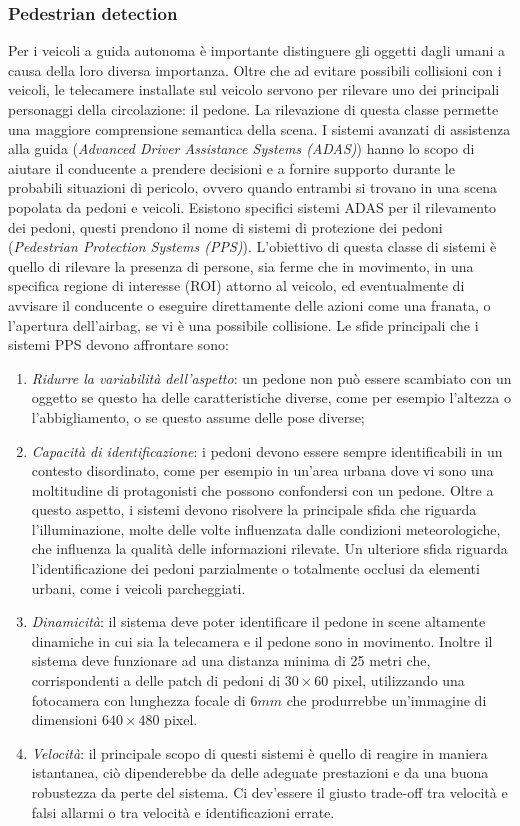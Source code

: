 \subsubsection{Pedestrian detection}
Per i veicoli a guida autonoma è importante distinguere gli oggetti dagli 
umani a causa della loro diversa importanza. Oltre che ad evitare possibili 
collisioni con i veicoli, le telecamere installate sul veicolo servono per 
rilevare uno dei principali personaggi della circolazione: il pedone. La rilevazione di 
questa classe permette una maggiore comprensione semantica della scena. I 
sistemi avanzati di assistenza alla guida (\emph{Advanced Driver Assistance Systems 
(ADAS)}) hanno lo scopo di aiutare il conducente a prendere decisioni 
e a fornire supporto durante le probabili situazioni di pericolo,  ovvero quando 
entrambi si trovano in una scena popolata da pedoni e veicoli. Esistono 
specifici sistemi ADAS per il rilevamento dei pedoni, questi prendono il 
nome di sistemi di protezione dei pedoni (\emph{Pedestrian Protection Systems 
(PPS)}). L'obiettivo di questa classe di sistemi è quello di rilevare la presenza 
di persone, sia ferme che in movimento, in una specifica regione di interesse 
(ROI) attorno al veicolo, ed eventualmente di avvisare il conducente  o eseguire 
direttamente delle azioni come una franata, o l'apertura dell'airbag, 
se vi è una possibile collisione. Le sfide principali che i sistemi PPS devono 
affrontare sono:
\begin{enumerate}
    \item \emph{Ridurre la variabilità dell'aspetto}: un pedone non può essere scambiato 
    con un oggetto se questo ha delle caratteristiche diverse, come per 
    esempio l'altezza o l'abbigliamento, o se questo assume delle pose 
    diverse;
    \item \emph{Capacità di identificazione}: i pedoni devono essere sempre identificabili 
    in un contesto disordinato, come per esempio in un'area urbana 
    dove vi sono una moltitudine di protagonisti che possono confondersi 
    con un pedone. Oltre a questo aspetto, i sistemi devono risolvere la 
    principale sfida che riguarda l'illuminazione, molte delle volte influenzata 
    dalle condizioni meteorologiche, che influenza la qualità delle 
    informazioni rilevate. Un ulteriore sfida riguarda l'identificazione dei 
    pedoni parzialmente o totalmente occlusi da elementi urbani, come i 
    veicoli parcheggiati. 
    \item \emph{Dinamicità}: il sistema deve poter identificare il pedone in scene 
    altamente dinamiche in cui sia la telecamera e il pedone sono in 
    movimento. Inoltre il sistema deve funzionare ad una distanza minima 
    di 25 metri che, corrispondenti a delle patch di pedoni di $30\times 60$ 
    pixel, utilizzando una fotocamera con lunghezza focale di $6 mm$ che 
    produrrebbe un'immagine di dimensioni $640\times 480$ pixel.
    \item \emph{Velocità}: il principale scopo di questi sistemi è quello di reagire in 
    maniera istantanea, ciò dipenderebbe da delle adeguate prestazioni e 
    da una buona robustezza da perte del sistema. Ci dev'essere il giusto 
    trade-off tra velocità e falsi allarmi o tra velocità e identificazioni 
    errate.
\end{enumerate}
